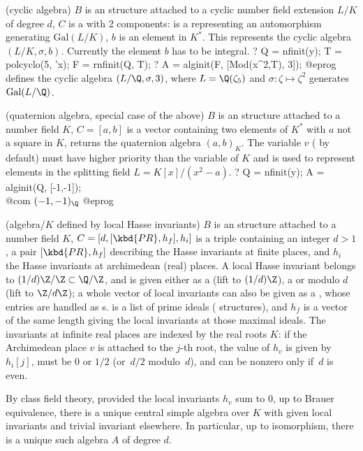 \item (cyclic algebra) $B$ is an  structure attached to a cyclic
number field extension $L/K$ of degree $d$, $C$ is a 
\kbd{[sigma,b]} with 2 components:  is a  representing
an automorphism generating $\text{Gal}(L/K)$, $b$ is an element in $K^*$. This
represents the cyclic algebra~$(L/K,\sigma,b)$. Currently the element $b$ has
to be integral.
\bprog
 ? Q = nfinit(y); T = polcyclo(5, 'x); F = rnfinit(Q, T);
 ? A = alginit(F, [Mod(x^2,T), 3]);
@eprog defines the cyclic algebra $(L/\Q, \sigma, 3)$, where
$L = \Q(\zeta_5)$ and $\sigma:\zeta\mapsto\zeta^2$ generates
$\text{Gal}(L/\Q)$.

\item (quaternion algebra, special case of the above) $B$ is an 
structure attached to a number field $K$, $C = [a,b]$ is a vector
containing two elements of $K^*$ with $a$ not a square in $K$, returns the quaternion algebra $(a,b)_K$.
The variable $v$ ( by default) must have higher priority than the
variable of $K$ and is used to represent elements in the splitting
field $L = K[x]/(x^2-a)$.
\bprog
 ? Q = nfinit(y); A = alginit(Q, [-1,-1]);  \\@com $(-1,-1)_\Q$
@eprog

\item (algebra/$K$ defined by local Hasse invariants)
$B$ is an  structure attached to a number field $K$,
$C = [d, [\kbd{PR},h_f], h_i]$ is a triple
containing an integer $d > 1$, a pair $[\kbd{PR}, h_f]$ describing the
Hasse invariants at finite places, and $h_i$ the Hasse invariants
at archimedean (real) places. A local Hasse invariant belongs to $(1/d)\Z/\Z
\subset \Q/\Z$, and is given either as a  (lift to $(1/d)\Z$),
a  or  modulo $d$ (lift to $\Z/d\Z$); a whole vector
of local invariants can also be given as a , whose
entries are handled as s.  is a list of prime ideals
( structures), and $h_f$ is a vector of the same length giving the
local invariants at those maximal ideals. The invariants at infinite real
places are indexed by the real roots $K$: if the Archimedean
place $v$ is attached to the $j$-th root, the value of
$h_v$ is given by $h_i[j]$, must be $0$ or $1/2$ (or~$d/2$ modulo~$d$), and
can be nonzero only if~$d$ is even.

By class field theory, provided the local invariants $h_v$ sum to $0$, up
to Brauer equivalence, there is a unique central simple algebra over $K$
with given local invariants and trivial invariant elsewhere. In particular,
up to isomorphism, there is a unique such algebra $A$ of degree $d$.

